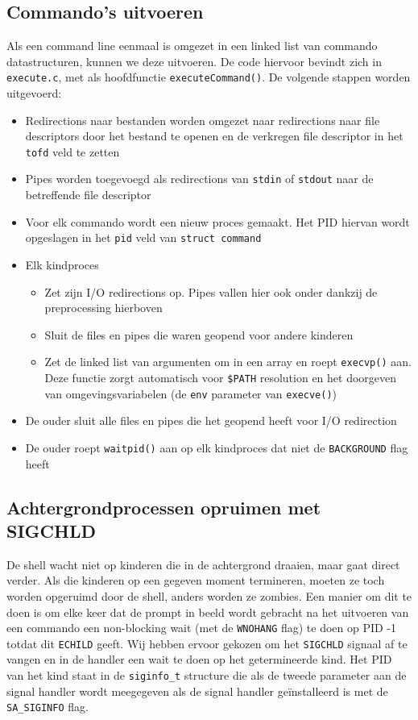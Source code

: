 \documentclass[11pt]{article}
\begin{document}
\subsection*{Commando's uitvoeren}
Als een command line eenmaal is omgezet in een linked list van commando datastructuren, kunnen we deze uitvoeren.
De code hiervoor bevindt zich in \verb+execute.c+, met als hoofdfunctie \verb+executeCommand()+. De volgende stappen
worden uitgevoerd:
\begin{itemize}
\item Redirections naar bestanden worden omgezet naar redirections naar file descriptors door het bestand te openen en de verkregen file descriptor in het \verb+tofd+ veld te zetten
\item Pipes worden toegevoegd als redirections van \verb+stdin+ of \verb+stdout+ naar de betreffende file descriptor
\item Voor elk commando wordt een nieuw proces gemaakt. Het PID hiervan wordt opgeslagen in het \verb+pid+ veld van \verb+struct command+
\item Elk kindproces
	\begin{itemize}
	\item Zet zijn I/O redirections op. Pipes vallen hier ook onder dankzij de preprocessing hierboven
	\item Sluit de files en pipes die waren geopend voor andere kinderen
	\item Zet de linked list van argumenten om in een array en roept \verb+execvp()+ aan. Deze functie zorgt automatisch voor \verb+$PATH+ resolution en het doorgeven van omgevingsvariabelen (de \verb+env+ parameter van \verb+execve()+)
	\end{itemize}
\item De ouder sluit alle files en pipes die het geopend heeft voor I/O redirection
\item De ouder roept \verb+waitpid()+ aan op elk kindproces dat niet de \verb+BACKGROUND+ flag heeft
\end{itemize}

\subsection*{Achtergrondprocessen opruimen met SIGCHLD}
De shell wacht niet op kinderen die in de achtergrond draaien, maar gaat direct verder. Als die kinderen
op een gegeven moment termineren, moeten ze toch worden opgeruimd door de shell, anders worden ze
zombies. Een manier om dit te doen is om elke keer dat de prompt in beeld wordt gebracht na het uitvoeren van
een commando een non-blocking wait (met de \verb+WNOHANG+ flag) te doen op PID -1 totdat dit \verb+ECHILD+ geeft.
Wij hebben ervoor gekozen om het \verb+SIGCHLD+ signaal af te vangen en in de handler een wait te doen
op het getermineerde kind. Het PID van het kind staat in de \verb+siginfo_t+ structure die
als de tweede parameter aan de signal handler wordt meegegeven als de signal handler ge\"installeerd
is met de \verb+SA_SIGINFO+ flag.
\end{document}
